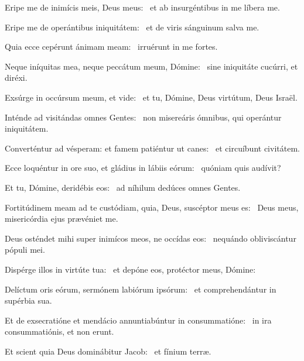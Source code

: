 \item Eripe me de inimícis meis, Deus meus:~\psstar{} et ab insurgéntibus in me líbera me.

\item Eripe me de operántibus iniquitátem:~\psstar{} et de viris sánguinum salva me.

\item Quia ecce cepérunt ánimam meam:~\psstar{} irruérunt in me fortes.

\item Neque iníquitas mea, neque peccátum meum, Dómine:~\psstar{} sine iniquitáte cucúrri, et diréxi.

\item Exsúrge in occúrsum meum, et vide:~\psstar{} et tu, Dómine, Deus virtútum, Deus Israël.

\item Inténde ad visitándas omnes Gentes:~\psstar{} non misereáris ómnibus, qui operántur iniquitátem.

\item Converténtur ad vésperam: et famem patiéntur ut canes:~\psstar{} et circuíbunt civitátem.

\item Ecce loquéntur in ore suo, et gládius in lábiis eórum:~\psstar{} quóniam quis audívit?

\item Et tu, Dómine, deridébis eos:~\psstar{} ad níhilum dedúces omnes Gentes.

\item Fortitúdinem meam ad te custódiam, quia, Deus, suscéptor meus es:~\psstar{} Deus meus, misericórdia ejus prævéniet me.

\item Deus osténdet mihi super inimícos meos, ne occídas eos:~\psstar{} nequándo obliviscántur pópuli mei.

\item Dispérge illos in virtúte tua:~\psstar{} et depóne eos, protéctor meus, Dómine:

\item Delíctum oris eórum, sermónem labiórum ipsórum:~\psstar{} et comprehendántur in supérbia sua.

\item Et de exsecratióne et mendácio annuntiabúntur in consummatióne:~\psstar{} in ira consummatiónis, et non erunt.

\item Et scient quia Deus dominábitur Jacob:~\psstar{} et fínium terræ.

